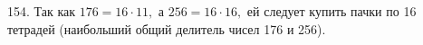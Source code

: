 154. Так как $176=16\cdot11,$ а $256=16\cdot16,$ ей следует купить пачки по 16 тетрадей (наибольший общий делитель чисел 176 и 256).\\

